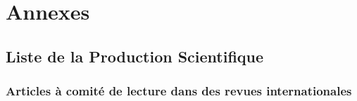 \documentclass[
  11pt,
]{article}
\begin{document}
\hypertarget{annexes}{%
\section{Annexes}\label{annexes}}

\hypertarget{articles}{%
\subsection{Liste de la Production Scientifique}\label{articles}}

\hypertarget{articles-uxe0-comituxe9-de-lecture-dans-des-revues-internationales}{%
\subsubsection{Articles à comité de lecture dans des revues
internationales}\label{articles-uxe0-comituxe9-de-lecture-dans-des-revues-internationales}}
\end{document}
